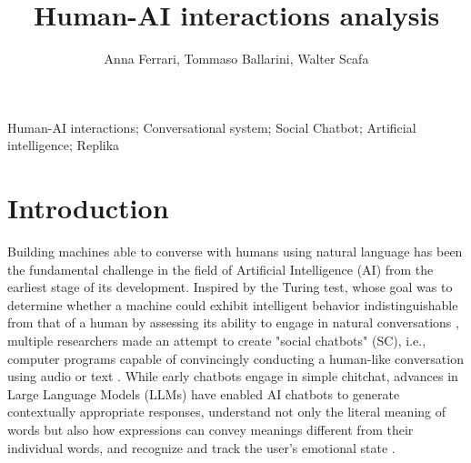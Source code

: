 \documentclass{article}
\title{Human-AI interactions analysis}
\author{Anna Ferrari, Tommaso Ballarini, Walter Scafa}
\begin{document}
\maketitle

\begin{Keywords}
Human-AI interactions; Conversational system; Social Chatbot; Artificial intelligence; Replika
\end{Keywords}


\section{Introduction}

Building machines able to converse with humans using natural language has been the fundamental challenge in the field of Artificial Intelligence (AI) from the earliest stage of its development. Inspired by the Turing test, whose goal was to determine whether a machine could exhibit intelligent behavior indistinguishable from that of a human by assessing its ability to engage in natural conversations \cite{turing1950computing}, multiple researchers made an attempt to create "social chatbots" (SC), i.e., computer programs capable of convincingly conducting a human-like conversation using audio or text \cite{article}. 
While early chatbots engage in simple chitchat, advances in Large Language Models (LLMs) have enabled AI chatbots to generate contextually appropriate responses, understand not only the literal meaning of words but also how expressions can convey meanings different from their individual words, and recognize and track the user’s emotional state \cite{chu2025illusionsintimacyemotionalattachment, article}. 
\end{document}
